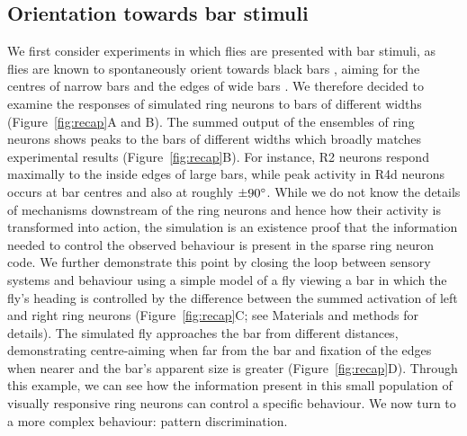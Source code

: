 \subsection*{Orientation towards bar stimuli}
We first consider experiments in which flies are presented with bar stimuli, as flies are known to spontaneously orient towards black bars \cite{Gotz1987}, aiming for the centres of narrow bars and the edges of wide bars \cite{Osorio1990}. We therefore decided to examine the responses of simulated ring neurons to bars of different widths (Figure~\ref{fig:recap}A and B). The summed output of the ensembles of ring neurons shows peaks to the bars of different widths which broadly matches experimental results (Figure~\ref{fig:recap}B). For instance, R2 neurons respond maximally to the inside edges of large bars, while peak activity in R4d neurons occurs at bar centres and also at roughly $\pm 90\degree$. While we do not know the details of mechanisms downstream of the ring neurons and hence how their activity is transformed into action, the simulation is an existence proof that the information needed to control the observed behaviour is present in the sparse ring neuron code. 
We further demonstrate this point by closing the loop between sensory systems and behaviour using a simple model of a fly viewing a bar in which the fly’s heading is controlled by the difference between the summed activation of left and right ring neurons (Figure~\ref{fig:recap}C; see Materials and methods for details). The simulated fly approaches the bar from different distances, demonstrating centre-aiming when far from the bar and fixation of the edges when nearer and the bar’s apparent size is greater (Figure~\ref{fig:recap}D). Through this example, we can see how the information present in this small population of visually responsive ring neurons can control a specific behaviour. We now turn to a more complex behaviour: pattern discrimination. 

